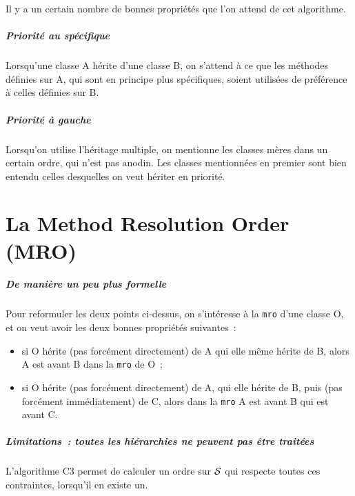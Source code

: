     Il y a un certain nombre de bonnes propriétés que l'on attend de cet
algorithme.

    \hypertarget{priorituxe9-au-spuxe9cifique}{%
\subparagraph{Priorité au
spécifique}\label{priorituxe9-au-spuxe9cifique}}

    Lorsqu'une classe A hérite d'une classe B, on s'attend à ce que les
méthodes définies sur A, qui sont en principe plus spécifiques, soient
utilisées de préférence à celles définies sur B.

    \hypertarget{priorituxe9-uxe0-gauche}{%
\subparagraph{Priorité à gauche}\label{priorituxe9-uxe0-gauche}}

    Lorsqu'on utilise l'héritage multiple, on mentionne les classes mères
dans un certain ordre, qui n'est pas anodin. Les classes mentionnées en
premier sont bien entendu celles desquelles on veut hériter en priorité.

    \hypertarget{la-method-resolution-order-mro}{%
\section{La Method Resolution Order
(MRO)}\label{la-method-resolution-order-mro}}

    \hypertarget{de-maniuxe8re-un-peu-plus-formelle}{%
\subparagraph{De manière un peu plus
formelle}\label{de-maniuxe8re-un-peu-plus-formelle}}

    Pour reformuler les deux points ci-dessus, on s'intéresse à la
\texttt{mro} d'une classe O, et on veut avoir les deux bonnes propriétés
suivantes~:

\begin{itemize}
\tightlist
\item
  si O hérite (pas forcément directement) de A qui elle même hérite de
  B, alors A est avant B dans la \texttt{mro} de O~;
\item
  si O hérite (pas forcément directement) de A, qui elle hérite de B,
  puis (pas forcément immédiatement) de C, alors dans la \texttt{mro} A
  est avant B qui est avant C.
\end{itemize}

    \hypertarget{limitations-toutes-les-hiuxe9rarchies-ne-peuvent-pas-uxeatre-traituxe9es}{%
\subparagraph{Limitations~: toutes les hiérarchies ne peuvent pas être
traitées}\label{limitations-toutes-les-hiuxe9rarchies-ne-peuvent-pas-uxeatre-traituxe9es}}

    L'algorithme C3 permet de calculer un ordre sur \(\cal{S}\) qui respecte
toutes ces contraintes, lorsqu'il en existe un.

